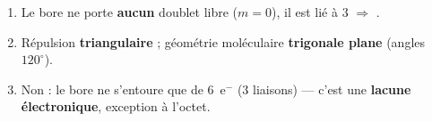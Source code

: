 \documentclass[11pt,a4paper]{article}
\begin{document}
\begin{corrige}
\begin{enumerate}[label=\alph*)]
  \item Le bore ne porte \textbf{aucun} doublet libre ($m=0$), il est lié à $3$ 
        $\Rightarrow$ .
  \item Répulsion \textbf{triangulaire} ; géométrie moléculaire \textbf{trigonale plane}
        (angles $120^\circ$).
  \item Non : le bore ne s'entoure que de $6$~e$^-$ ($3$ liaisons) — c'est une \textbf{lacune
        électronique}, exception à l'octet.
\end{enumerate}
\end{corrige}
\end{document}
